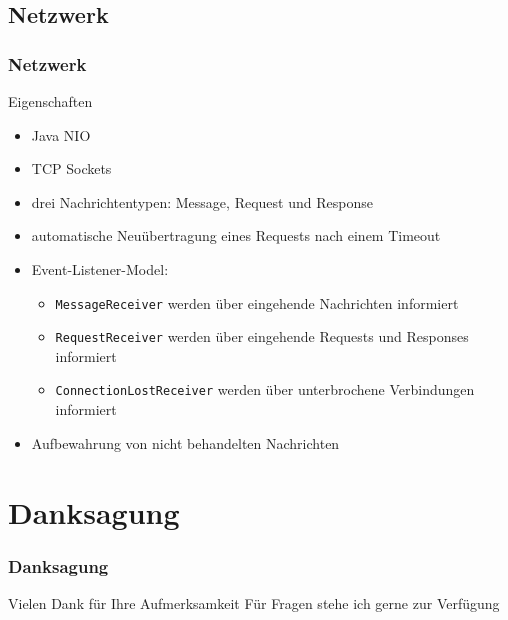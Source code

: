 \documentclass{beamer}
\begin{document}
	\subsection{Netzwerk}

		\begin{frame}
			\frametitle{Netzwerk}

			\begin{block}{Eigenschaften}
				\begin{itemize}
					\item Java NIO
					\item TCP Sockets
					\item drei Nachrichtentypen: Message, Request und Response
					\item automatische Neuübertragung eines Requests nach einem Timeout
					\item Event-Listener-Model:
						\begin{itemize}
							\item \texttt{MessageReceiver} werden über eingehende Nachrichten informiert
							\item \texttt{RequestReceiver} werden über eingehende Requests und Responses informiert
							\item \texttt{ConnectionLostReceiver} werden über unterbrochene Verbindungen informiert
						\end{itemize}
					\item Aufbewahrung von nicht behandelten Nachrichten
				\end{itemize}
			\end{block}					
		\end{frame}

\section*{Danksagung}

		\begin{frame}
			\frametitle{Danksagung}

			\begin{block}{Vielen Dank für Ihre Aufmerksamkeit}
				Für Fragen stehe ich gerne zur Verfügung
			\end{block}
		\end{frame}
\end{document}
